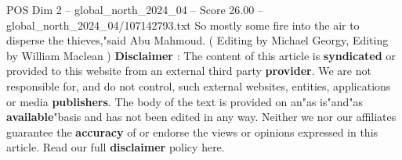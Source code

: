 \begin{textsample}{POS Dim 2 – global\_north\_2024\_04 – Score 26.00 – global\_north\_2024\_04/107142793.txt}
So mostly some fire into the air to disperse the thieves,"said Abu Mahmoud. ( Editing by Michael Georgy, Editing by William Maclean ) \textbf{Disclaimer} : The content of this article is \textbf{syndicated} or provided to this website from an external third party \textbf{provider}.
We are not responsible for, and do not control, such external websites, entities, applications or media \textbf{publishers}.
The body of the text is provided on an"as is"and"as \textbf{available}"basis and has not been edited in any way.
Neither we nor our affiliates guarantee the \textbf{accuracy} of or endorse the views or opinions expressed in this article.
Read our full \textbf{disclaimer} policy here.

\end{textsample}
